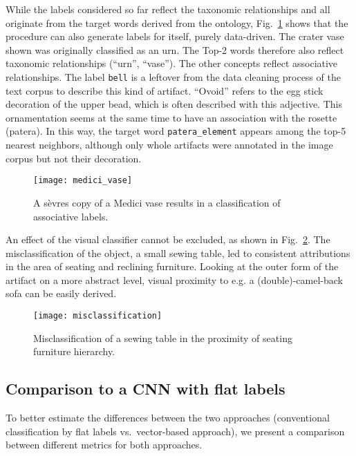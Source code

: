 While the labels considered so far reflect the taxonomic relationships and all originate from the target words derived from the ontology, Fig.~\ref{fig:medici_vase} shows that the procedure can also generate labels for itself, purely data-driven. The crater vase shown was originally classified as an urn. The Top-2 words therefore also reflect taxonomic relationships (\enquote{urn}, \enquote{vase}). The other concepts reflect associative relationships. The label \texttt{bell} is a leftover from the data cleaning process of the text corpus to describe this kind of artifact. \enquote{Ovoid} refers to the egg stick decoration of the upper bead, which is often described with this adjective. This ornamentation seems at the same time to have an association with the rosette (patera). In this way, the target word \texttt{patera\_element} appears among the top-5 nearest neighbors, although only whole artifacts were annotated in the image corpus but not their decoration.


\begin{figure}
    \centering
    \texttt{[image: medici\_vase]}
    \caption{A sèvres copy of a Medici vase results in a classification of associative labels.}
    \label{fig:medici_vase}
\end{figure}


An effect of the visual classifier cannot be excluded, as shown in Fig.~\ref{fig:misclassification}. The misclassification of the object, a small sewing table, led to consistent attributions in the area of seating and reclining furniture. Looking at the outer form of the artifact on a more abstract level, visual proximity to e.g. a (double)-camel-back sofa can be easily derived.


\begin{figure}
    \centering
    \texttt{[image: misclassification]}
    \caption{Misclassification of a sewing table in the proximity of seating furniture hierarchy.}
    \label{fig:misclassification}
\end{figure}


\subsection{Comparison to a CNN with flat labels}

To better estimate the differences between the two approaches (conventional classification by flat labels vs.~vector-based approach), we present a comparison between different metrics for both approaches.

